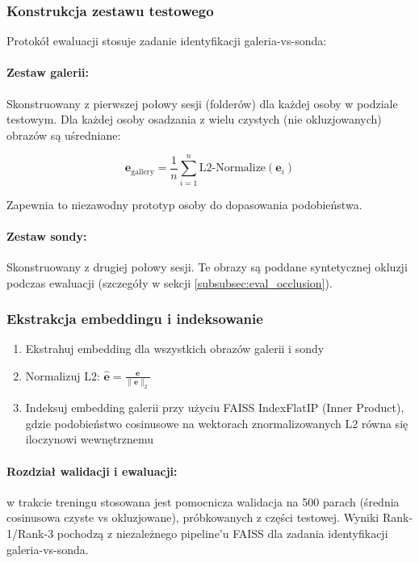 \subsubsection{Konstrukcja zestawu testowego}
Protokół ewaluacji stosuje zadanie identyfikacji galeria-vs-sonda:

\paragraph{Zestaw galerii:} Skonstruowany z pierwszej połowy sesji (folderów) dla każdej osoby w podziale testowym. Dla każdej osoby osadzania z wielu czystych (nie okluzjowanych) obrazów są uśredniane:

\begin{equation}
\mathbf{e}_{\text{gallery}} = \frac{1}{n} \sum_{i=1}^{n} \text{L2-Normalize}(\mathbf{e}_i)
\end{equation}

Zapewnia to niezawodny prototyp osoby do dopasowania podobieństwa.

\paragraph{Zestaw sondy:} Skonstruowany z drugiej połowy sesji. Te obrazy są poddane syntetycznej okluzji podczas ewaluacji (szczegóły w sekcji \ref{subsubsec:eval_occlusion}).

\subsubsection{Ekstrakcja embeddingu i indeksowanie}
\begin{enumerate}
    \item Ekstrahuj embedding dla wszystkich obrazów galerii i sondy
    \item Normalizuj L2: $\hat{\mathbf{e}} = \frac{\mathbf{e}}{\|\mathbf{e}\|_2}$
    \item Indeksuj embedding galerii przy użyciu FAISS IndexFlatIP (Inner Product), gdzie podobieństwo cosinusowe na wektorach znormalizowanych L2 równa się iloczynowi wewnętrznemu
\end{enumerate}

\paragraph{Rozdział walidacji i ewaluacji:} w trakcie treningu stosowana jest pomocnicza walidacja na 500 parach (średnia cosinusowa czyste vs okluzjowane), próbkowanych z części testowej. Wyniki Rank-1/Rank-3 pochodzą z niezależnego pipeline’u FAISS dla zadania identyfikacji galeria-vs-sonda.

